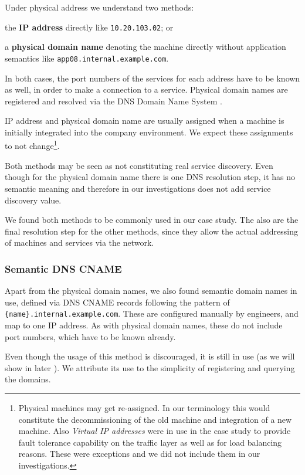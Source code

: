 Under physical address we understand two methods:
\begin{tenumerate}
  \item the \textbf{IP address} directly like \lstinline{10.20.103.02}; or
  \item a \textbf{physical domain name} denoting the machine directly without application semantics like \lstinline{app08.internal.example.com}.
\end{tenumerate}

In both cases, the port numbers of the services for each address have to be known as well, in order to make a connection to a service. Physical domain names are registered and resolved via the DNS Domain Name System \cite{rfc1591}.

IP address and physical domain name are usually assigned when a machine is initially integrated into the company environment. We expect these assignments to not change\footnote{Physical machines may get re-assigned. In our terminology this would constitute the decommissioning of the old machine and integration of a new machine. Also \emph{Virtual IP addresses} were in use in the case study to provide fault tolerance capability on the traffic layer as well as for load balancing reasons. These were exceptions and we did not include them in our investigations.}.

Both methods may be seen as not constituting real service discovery. Even though for the physical domain name there is one DNS resolution step, it has no semantic meaning and therefore in our investigations does not add service discovery value.

We found both methods to be commonly used in our case study. The also are the final resolution step for the other methods, since they allow the actual addressing of machines and services via the network.

\subsubsection{Semantic DNS CNAME}

Apart from the physical domain names, we also found semantic domain names in use, defined via DNS CNAME records following the pattern of \lstinline!{name}.internal.example.com!. These are configured manually by engineers, and map to one IP address. As with physical domain names, these do not include port numbers, which have to be known already.

Even though the usage of this method is discouraged, it is still in use (as we will show in later ). We attribute its use to the simplicity of registering and querying the domains.

